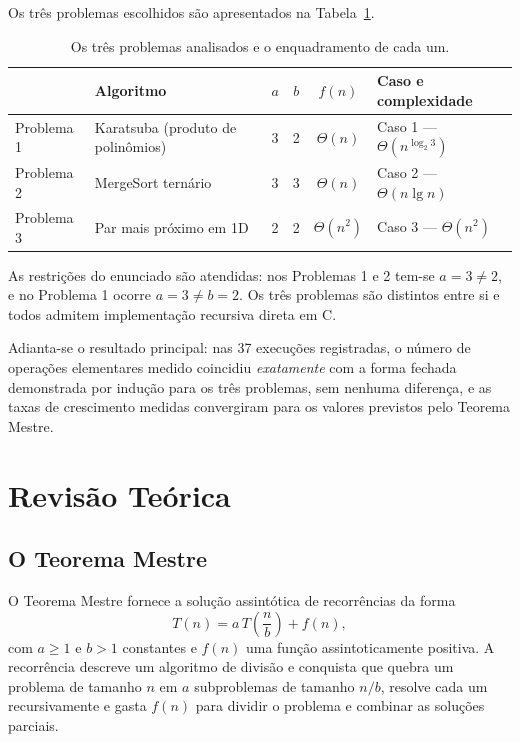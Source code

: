 \documentclass[11pt,a4paper]{article}
\begin{document}
Os três problemas escolhidos são apresentados na Tabela~\ref{tab:escolhas}.

\begin{table}[H]
\centering
\caption{Os três problemas analisados e o enquadramento de cada um.}
\label{tab:escolhas}
\small
\begin{tabular}{llcccl}
\toprule
 & Algoritmo & $a$ & $b$ & $f(n)$ & Caso e complexidade \\
\midrule
Problema 1 & Karatsuba (produto de polinômios) & 3 & 2 & $\Theta(n)$ & Caso 1 --- $\Theta(n^{\log_2 3})$ \\
Problema 2 & MergeSort ternário & 3 & 3 & $\Theta(n)$ & Caso 2 --- $\Theta(n\lg n)$ \\
Problema 3 & Par mais próximo em 1D & 2 & 2 & $\Theta(n^2)$ & Caso 3 --- $\Theta(n^2)$ \\
\bottomrule
\end{tabular}
\end{table}

As restrições do enunciado são atendidas: nos Problemas 1 e 2 tem-se $a=3\neq2$, e no Problema 1 ocorre $a=3\neq b=2$. Os três problemas são distintos entre si e todos admitem implementação recursiva direta em C.

Adianta-se o resultado principal: nas 37 execuções registradas, o número de operações elementares medido coincidiu \emph{exatamente} com a forma fechada demonstrada por indução para os três problemas, sem nenhuma diferença, e as taxas de crescimento medidas convergiram para os valores previstos pelo Teorema Mestre.

\section{Revisão Teórica}

\subsection{O Teorema Mestre}

O Teorema Mestre fornece a solução assintótica de recorrências da forma
\begin{equation}
T(n)=a\,T\!\left(\frac nb\right)+f(n),
\label{eq:mestre}
\end{equation}
com $a\ge1$ e $b>1$ constantes e $f(n)$ uma função assintoticamente positiva. A recorrência descreve um algoritmo de divisão e conquista que quebra um problema de tamanho $n$ em $a$ subproblemas de tamanho $n/b$, resolve cada um recursivamente e gasta $f(n)$ para dividir o problema e combinar as soluções parciais.
\end{document}

